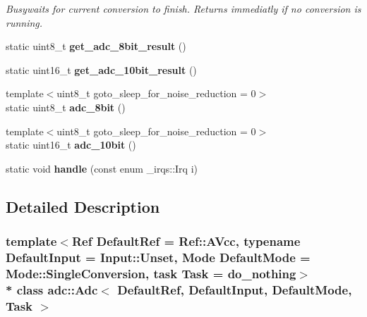 \begin{DoxyCompactItemize}
\begin{DoxyCompactList}\small\item\em Busywaits for current conversion to finish. Returns immediatly if no conversion is running. \end{DoxyCompactList}\item 
static uint8\+\_\+t {\bfseries get\+\_\+adc\+\_\+8bit\+\_\+result} ()\hypertarget{classadc_1_1Adc_a1044fe51b95416b2030454b3869ec195}{}\label{classadc_1_1Adc_a1044fe51b95416b2030454b3869ec195}

\item 
static uint16\+\_\+t {\bfseries get\+\_\+adc\+\_\+10bit\+\_\+result} ()\hypertarget{classadc_1_1Adc_a75998163e7a038560cdc29344208ba15}{}\label{classadc_1_1Adc_a75998163e7a038560cdc29344208ba15}

\item 
{\footnotesize template$<$uint8\+\_\+t goto\+\_\+sleep\+\_\+for\+\_\+noise\+\_\+reduction = 0$>$ }\\static uint8\+\_\+t {\bfseries adc\+\_\+8bit} ()\hypertarget{classadc_1_1Adc_a2b2e98b10cfa98a34ac491150304f58e}{}\label{classadc_1_1Adc_a2b2e98b10cfa98a34ac491150304f58e}

\item 
{\footnotesize template$<$uint8\+\_\+t goto\+\_\+sleep\+\_\+for\+\_\+noise\+\_\+reduction = 0$>$ }\\static uint16\+\_\+t {\bfseries adc\+\_\+10bit} ()\hypertarget{classadc_1_1Adc_ae90131099182fa17167766def8065138}{}\label{classadc_1_1Adc_ae90131099182fa17167766def8065138}

\item 
static void {\bfseries handle} (const enum \+\_\+irqs\+::\+Irq i)\hypertarget{classadc_1_1Adc_a29553e78481cc637a6dbc5e59da0c3ba}{}\label{classadc_1_1Adc_a29553e78481cc637a6dbc5e59da0c3ba}

\end{DoxyCompactItemize}


\subsection{Detailed Description}
\subsubsection*{template$<$Ref Default\+Ref = Ref\+::\+A\+Vcc, typename Default\+Input = Input\+::\+Unset, Mode Default\+Mode = Mode\+::\+Single\+Conversion, task Task = do\+\_\+nothing$>$\\*
class adc\+::\+Adc$<$ Default\+Ref, Default\+Input, Default\+Mode, Task $>$}

